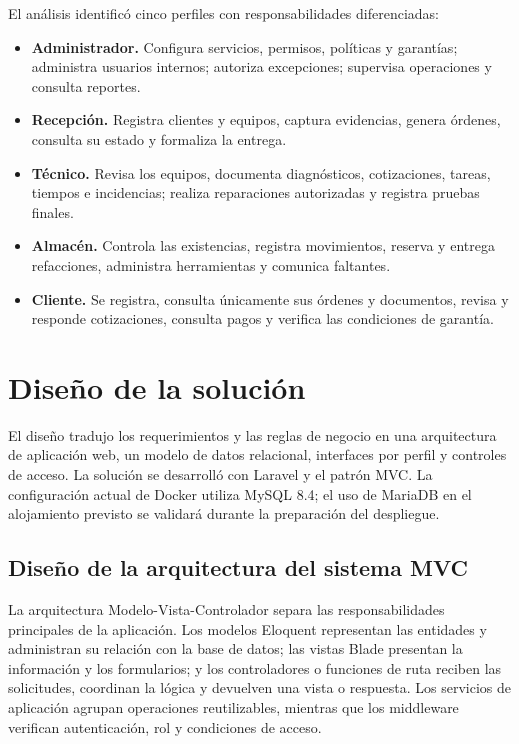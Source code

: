 El análisis identificó cinco perfiles con responsabilidades diferenciadas:

\begin{itemize}
    \item \textbf{Administrador.} Configura servicios, permisos, políticas y garantías; administra usuarios internos; autoriza excepciones; supervisa operaciones y consulta reportes.
    \item \textbf{Recepción.} Registra clientes y equipos, captura evidencias, genera órdenes, consulta su estado y formaliza la entrega.
    \item \textbf{Técnico.} Revisa los equipos, documenta diagnósticos, cotizaciones, tareas, tiempos e incidencias; realiza reparaciones autorizadas y registra pruebas finales.
    \item \textbf{Almacén.} Controla las existencias, registra movimientos, reserva y entrega refacciones, administra herramientas y comunica faltantes.
    \item \textbf{Cliente.} Se registra, consulta únicamente sus órdenes y documentos, revisa y responde cotizaciones, consulta pagos y verifica las condiciones de garantía.
\end{itemize}

\section{Diseño de la solución}

El diseño tradujo los requerimientos y las reglas de negocio en una arquitectura de aplicación web, un modelo de datos relacional, interfaces por perfil y controles de acceso. La solución se desarrolló con Laravel y el patrón MVC. La configuración actual de Docker utiliza MySQL 8.4; el uso de MariaDB en el alojamiento previsto se validará durante la preparación del despliegue.

\subsection{Diseño de la arquitectura del sistema MVC}

La arquitectura Modelo-Vista-Controlador separa las responsabilidades principales de la aplicación. Los modelos Eloquent representan las entidades y administran su relación con la base de datos; las vistas Blade presentan la información y los formularios; y los controladores o funciones de ruta reciben las solicitudes, coordinan la lógica y devuelven una vista o respuesta. Los servicios de aplicación agrupan operaciones reutilizables, mientras que los middleware verifican autenticación, rol y condiciones de acceso.

